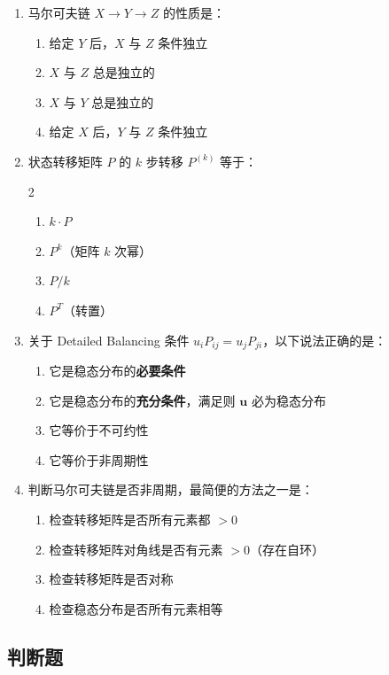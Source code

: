 \documentclass[12pt,a4paper]{ctexart}
\begin{document}
\begin{enumerate}[label=\arabic*., leftmargin=*]
\item 马尔可夫链 $X \to Y \to Z$ 的性质是：
\begin{enumerate}[label=(\Alph*)]
  \item 给定 $Y$ 后，$X$ 与 $Z$ 条件独立
  \item $X$ 与 $Z$ 总是独立的
  \item $X$ 与 $Y$ 总是独立的
  \item 给定 $X$ 后，$Y$ 与 $Z$ 条件独立
\end{enumerate}

\item 状态转移矩阵 $P$ 的 $k$ 步转移 $P^{(k)}$ 等于：
\begin{multicols}{2}
\begin{enumerate}[label=(\Alph*)]
  \item $k \cdot P$
  \item $P^k$（矩阵 $k$ 次幂）
  \item $P / k$
  \item $P^T$（转置）
\end{enumerate}
\end{multicols}

\item 关于 Detailed Balancing 条件 $u_i P_{ij} = u_j P_{ji}$，以下说法正确的是：
\begin{enumerate}[label=(\Alph*)]
  \item 它是稳态分布的\textbf{必要条件}
  \item 它是稳态分布的\textbf{充分条件}，满足则 $\mathbf{u}$ 必为稳态分布
  \item 它等价于不可约性
  \item 它等价于非周期性
\end{enumerate}

\item 判断马尔可夫链是否非周期，最简便的方法之一是：
\begin{enumerate}[label=(\Alph*)]
  \item 检查转移矩阵是否所有元素都 $>0$
  \item 检查转移矩阵对角线是否有元素 $>0$（存在自环）
  \item 检查转移矩阵是否对称
  \item 检查稳态分布是否所有元素相等
\end{enumerate}

\end{enumerate}

\subsection*{判断题}
\end{document}
